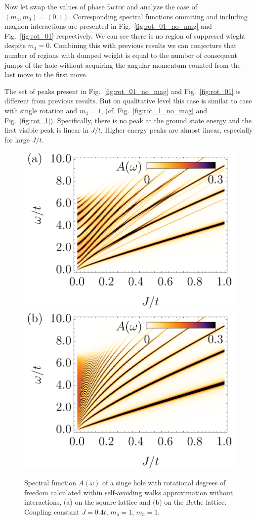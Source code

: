 \documentclass[%
 reprint,
 amsmath,amssymb,
 aps,
prb,
floatfix,
]{revtex4-1}
\begin{document}
Now let swap the values of phase factor and analyze the case of $(m_4,m_3) = (0,1)$. Corresponding spectral functions ommiting and including magnon interactions are presented in Fig.~\ref{fig:rot_01_no_mag} and Fig.~\ref{fig:rot_01} respectively. We can see there is no region of suppresed wieght despite $m_4 = 0$. Combining this with previous results we can conjecture that number of regions with dumped weight is equal to the number of consequent jumps of the hole without acquiring the angular momentum counted from the last move to the first move. 

The set of peaks present in Fig.~\ref{fig:rot_01_no_mag} and Fig.~\ref{fig:rot_01} is different from previous results. But on qualitative level this case is similar to case with single rotation and $m_4 = 1$, (cf. Fig.~\ref{fig:rot_1_no_mag} and Fig.~\ref{fig:rot_1}). Specifically, there is no peak at the ground state energy and the first visible peak is linear in $J/t$. Higher energy peaks are almost linear, especially for large $J/t$.

\begin{figure}[ht!]
	\includegraphics[width=0.49\columnwidth]
	{./figures/square/[1, 1]_noint.png}
	\includegraphics[width=0.49\columnwidth]
	{./figures/bethe/[1, 1]_noint.png}
	\caption{
		Spectral function $A(\omega)$ of a singe hole with rotational degrees of freedom calculated within self-avoiding walks approximation without interactions, (a) on the square lattice and (b) on the Bethe lattice. Coupling constant $J=0.4t$, $m_4 = 1$, $m_3 = 1$.
	}\label{fig:rot_11_no_mag}
\end{figure}
\end{document}
